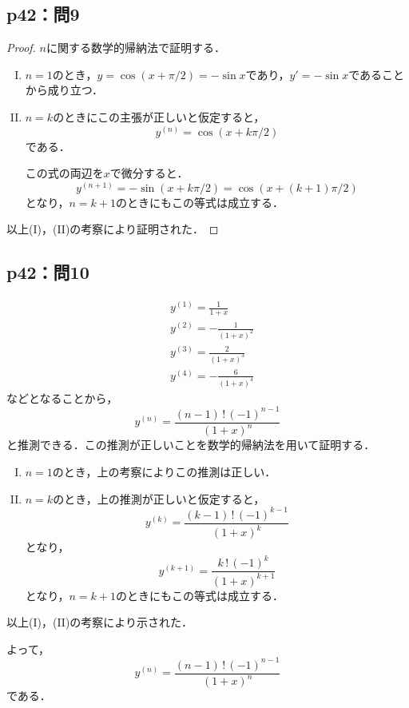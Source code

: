 \documentclass[uplatex,dvipdfmx,a4paper,10pt,fleqn]{jsarticle}
\begin{document}
    


\subsection*{p42：問9}

\begin{tleftbar}
    \begin{proof}
        $n$に関する数学的帰納法で証明する．
        \begin{enumerate}[(I)]
            \item $n=1$のとき，$y= \cos (x +\pi /2)= -\sin x$であり，$y' = -\sin x$であることから成り立つ．
            \item $n=k$のときにこの主張が正しいと仮定すると，
            \[
                y^{(n)} = \cos ( x + k \pi /2)
            \]
            である．

            この式の両辺を$x$で微分すると．
            \[
                y^{(n+1)} = -\sin (x+ k \pi/2)= \cos (x+ (k+1)\pi/2)
            \]
            となり，$n =k+1$のときにもこの等式は成立する．
        \end{enumerate}
            以上(I)，(II)の考察により証明された．
    \end{proof}
\end{tleftbar}


\subsection*{p42：問10}

\begin{tleftbar}
    \begin{align*} 
        & y^{(1)}= \frac{1}{1+x} \\
        & y^{(2)}=-\frac{1}{(1+x)^2} \\
        & y^{(3)}=\frac{2}{(1+x)^3} \\
        & y^{(4)}= -\frac{6}{(1+x)^4}
    \end{align*} 
    などとなることから，
    \[
        y^{(n)} = \frac{(n-1)\,!\, (-1)^{n-1}}{(1+x)^n}
    \]
    と推測できる．この推測が正しいことを数学的帰納法を用いて証明する．
    \begin{enumerate}[(I)]
       \item  $n=1$のとき，上の考察によりこの推測は正しい．
       \item $n=k$のとき，上の推測が正しいと仮定すると，
       \[
        y^{(k)} = \frac{(k-1)\,!\,(-1)^{k-1}}{(1+x)^k}
       \]
       となり，
       \[
        y^{(k+1)}  = \frac{k\,!\, (-1)^{k}}{(1+x)^{k+1}}
        \] 
        となり，$n=k+1$のときにもこの等式は成立する．
    \end{enumerate}
    以上(I)，(II)の考察により示された．

    よって，
    \[
        y^{(n)} = \frac{(n-1)\,!\, (-1)^{n-1}}{(1+x)^n}
    \]
    である．
\end{tleftbar}
\end{document}
